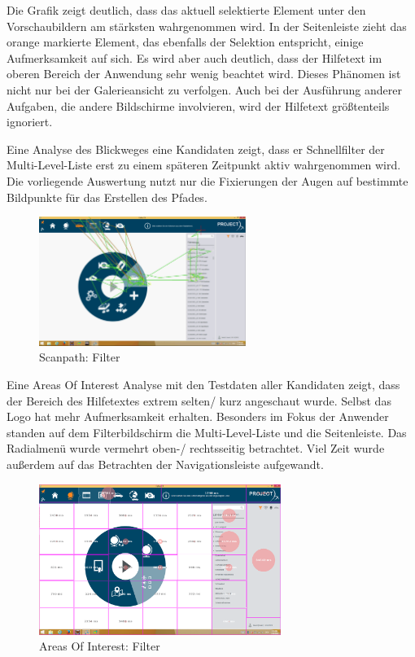 Die Grafik zeigt deutlich, dass das aktuell selektierte Element unter den Vorschaubildern am stärksten wahrgenommen wird. In der Seitenleiste zieht das orange markierte Element, das ebenfalls der Selektion entspricht, einige Aufmerksamkeit auf sich. Es wird aber auch deutlich, dass der Hilfetext im oberen Bereich der Anwendung sehr wenig beachtet wird. Dieses Phänomen ist nicht nur bei der Galerieansicht zu verfolgen. Auch bei der Ausführung anderer Aufgaben, die andere Bildschirme involvieren, wird der Hilfetext größtenteils ignoriert.\par
Eine Analyse des Blickweges eine Kandidaten zeigt, dass er Schnellfilter der Multi-Level-Liste erst zu einem späteren Zeitpunkt aktiv wahrgenommen wird. Die vorliegende Auswertung nutzt nur die Fixierungen der Augen auf bestimmte Bildpunkte für das Erstellen des Pfades.\par
\begin{figure}[H]
 \centering
 \includegraphics[width=0.6\textwidth]{grafiken/scanpath.png}
 \caption{Scanpath: Filter}
 \label{fig:scanFilter}
\end{figure}
Eine Areas Of Interest Analyse mit den Testdaten aller Kandidaten zeigt, dass der Bereich des Hilfetextes extrem selten/ kurz angeschaut wurde. Selbst das Logo hat mehr Aufmerksamkeit erhalten. Besonders im Fokus der Anwender standen auf dem Filterbildschirm die Multi-Level-Liste und die Seitenleiste. Das Radialmenü wurde vermehrt oben-/ rechtsseitig betrachtet. Viel Zeit wurde außerdem auf das Betrachten der Navigationsleiste aufgewandt.
\begin{figure}[H]
 \centering
 \includegraphics[width=0.7\textwidth]{grafiken/areas_of_interest_filter.png}
 \caption{Areas Of Interest: Filter}
 \label{fig:aoiFIlter}
\end{figure}

